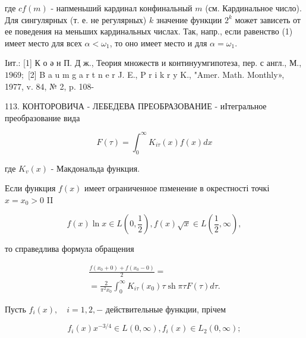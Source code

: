 \documentclass[10pt]{article}
\begin{document}
где $c f(m)$ - напменьший кардинал конфинальный $m$ (см. Кардинальное число). Для сингулярных (т. е. не регулярных) $k$ значение функции $2^{k}$ может зависеть от ее поведения на меньших кардинальных числах. Так, напр., если равенство (1) имеет место для всех $\alpha<\omega_{1}$, то оно имеет место и для $\alpha=\omega_{1}$.



Iит.: [1] К о ә н П. Д ж., Теория множеств и континуумгипотеза, пер. с англ., М., $1969 ;$ [2] B a u m g a r t n e r J. E., P r i k r y K., "Amer. Math. Monthly», 1977, v. 84, № 2, p. 108-

113. КОНТОРОВИЧА - ЛЕБЕДЕВА ПРЕОБРАЗОВАНИЕ - иІтегральное преобразование вида



\[

F(\tau)=\int_{0}^{\infty} K_{i \tau}(x) f(x) d x

\]



где $K_{v}(x)$ - Макдональда функция.



Если функция $f(x)$ имеет ограниченное пзменение в окрестності точкі $x=x_{0}>0$ II



\[

f(x) \ln x \in L\left(0, \frac{1}{2}\right), f(x) \sqrt{x} \in L\left(\frac{1}{2}, \infty\right),

\]



то справедлива формула обращения



\[

\begin{gathered}

\frac{f\left(x_{0}+0\right)+f\left(x_{0}-0\right)}{2}= \\

=\frac{2}{\pi^{2} x_{0}} \int_{0}^{\infty} K_{i \tau}\left(x_{0}\right) \tau \operatorname{sh} \pi \tau F(\tau) d \tau .

\end{gathered}

\]



Пусть $f_{i}(x), \quad i=1,2,-$ действительные функции, прічем



\[

f_{i}(x) x^{-3 / 4} \in L(0, \infty), f_{i}(x) \in L_{2}(0, \infty) ;

\]
\end{document}
